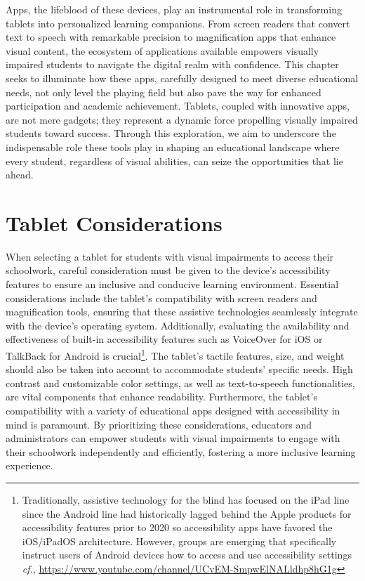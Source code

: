 \documentclass[14pt,letterpaper,twoside]{extreport}
\begin{document}
Apps, the lifeblood of these devices, play an instrumental role in transforming tablets into personalized learning companions. From screen readers that convert text to speech with remarkable precision to magnification apps that enhance visual content, the ecosystem of applications available empowers visually impaired students to navigate the digital realm with confidence. This chapter seeks to illuminate how these apps, carefully designed to meet diverse educational needs, not only level the playing field but also pave the way for enhanced participation and academic achievement. Tablets, coupled with innovative apps, are not mere gadgets; they represent a dynamic force propelling visually impaired students toward success. Through this exploration, we aim to underscore the indispensable role these tools play in shaping an educational landscape where every student, regardless of visual abilities, can seize the opportunities that lie ahead.

\hypertarget{tablet-considerations}{%
	\section{Tablet Considerations}\label{tablet-considerations}}
When selecting a tablet for students with visual impairments to access their schoolwork, careful consideration must be given to the device's accessibility features to ensure an inclusive and conducive learning environment. Essential considerations include the tablet's compatibility with screen readers and magnification tools, ensuring that these assistive technologies seamlessly integrate with the device's operating system. Additionally, evaluating the availability and effectiveness of built-in accessibility features such as VoiceOver for iOS or TalkBack for Android is crucial\footnote{Traditionally, assistive technology for the blind has focused on the iPad line since the Android line had historically lagged behind the Apple products for accessibility features prior to 2020 so accessibility apps have favored the iOS/iPadOS architecture. However, groups are emerging that specifically instruct users of Android devices how to access and use accessibility settings \textit{cf.}, \href{Blind Android Users}{https://www.youtube.com/channel/UCvEM-SmpwElNALldhp8hG1g}}. The tablet's tactile features, size, and weight should also be taken into account to accommodate students' specific needs. High contrast and customizable color settings, as well as text-to-speech functionalities, are vital components that enhance readability. Furthermore, the tablet's compatibility with a variety of educational apps designed with accessibility in mind is paramount. By prioritizing these considerations, educators and administrators can empower students with visual impairments to engage with their schoolwork independently and efficiently, fostering a more inclusive learning experience.
\end{document}
